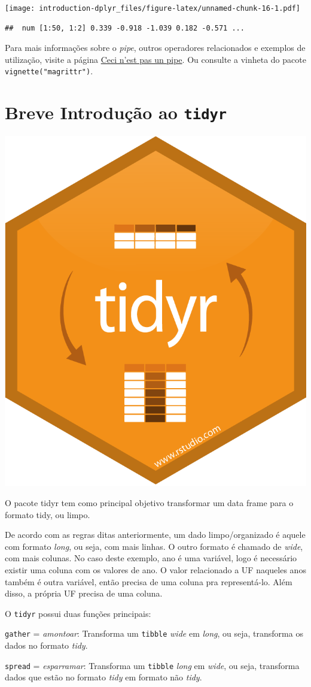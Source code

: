 \documentclass[a4paper]{book}
\begin{document}
\texttt{[image: introduction-dplyr\_files/figure-latex/unnamed-chunk-16-1.pdf]}

\begin{verbatim}
##  num [1:50, 1:2] 0.339 -0.918 -1.039 0.182 -0.571 ...
\end{verbatim}

Para mais informações sobre o \emph{pipe}, outros operadores relacionados e exemplos de utilização, visite a página \href{https://cran.r-project.org/web/packages/magrittr/vignettes/magrittr.html}{Ceci n'est pas un pipe}. Ou consulte a vinheta do pacote \texttt{vignette("magrittr")}.

\hypertarget{breve-introduuxe7uxe3o-ao-tidyr}{%
\section{\texorpdfstring{Breve Introdução ao \texttt{tidyr}}{Breve Introdução ao tidyr}}\label{breve-introduuxe7uxe3o-ao-tidyr}}

\begin{center}\includegraphics[width=0.25\linewidth]{imagens/tidyr} \end{center}

O pacote tidyr tem como principal objetivo transformar um data frame para o formato tidy, ou limpo.

De acordo com as regras ditas anteriormente, um dado limpo/organizado é aquele com formato \emph{long}, ou seja, com mais linhas. O outro formato é chamado de \emph{wide}, com mais colunas. No caso deste exemplo, ano é uma variável, logo é necessário existir uma coluna com os valores de ano. O valor relacionado a UF naqueles anos também é outra variável, então precisa de uma coluna pra representá-lo. Além disso, a própria UF precisa de uma coluna.

O \texttt{tidyr} possui duas funções principais:

\texttt{gather} = \emph{amontoar}: Transforma um \texttt{tibble} \emph{wide} em \emph{long}, ou seja, transforma os dados no formato \emph{tidy}.

\texttt{spread} = \emph{esparramar}: Transforma um \texttt{tibble} \emph{long} em \emph{wide}, ou seja, transforma dados que estão no formato \emph{tidy} em formato não \emph{tidy}.
\end{document}
